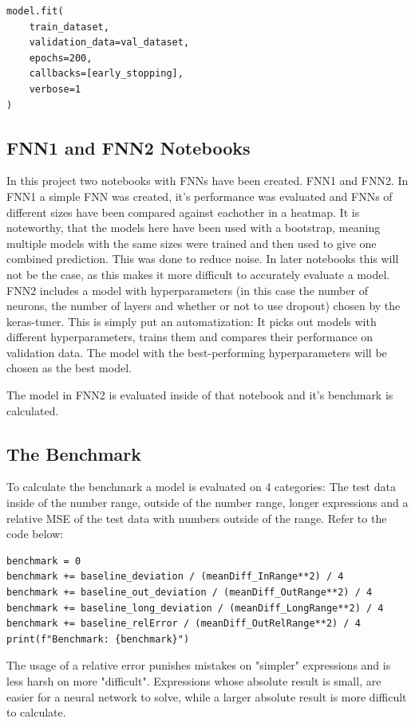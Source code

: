 \documentclass{article}
\begin{document}
\begin{Verbatim}
model.fit(
    train_dataset,
    validation_data=val_dataset,
    epochs=200,
    callbacks=[early_stopping],
    verbose=1
)
\end{Verbatim}

\subsection{FNN1 and FNN2 Notebooks}
In this project two notebooks with FNNs have been created. FNN1 and FNN2. 
In FNN1 a simple FNN was created, it's performance was evaluated and FNNs 
of different sizes have been compared against eachother in a heatmap. It is 
noteworthy, that the models here have been used with a bootstrap, meaning 
multiple models with the same sizes were trained and then used to give one 
combined prediction. This was done to reduce noise. In later notebooks this 
will not be the case, as this makes it more difficult to accurately evaluate 
a model.
\\[2em]
FNN2 includes a model with hyperparameters (in this case the number of 
neurons, the number of layers and whether or not to use dropout) chosen by 
the keras-tuner. This is simply put an automatization: It picks out models 
with different hyperparameters, trains them and compares their performance 
on validation data. The model with the best-performing hyperparameters will 
be chosen as the best model.

The model in FNN2 is evaluated inside of that notebook and it's benchmark 
is calculated.

\subsection{The Benchmark}
To calculate the benchmark a model is evaluated on 4 categories: The test 
data inside of the number range, outside of the number range, longer 
expressions and a relative MSE of the test data with numbers outside of the 
range.
Refer to the code below:
\begin{Verbatim}
benchmark = 0
benchmark += baseline_deviation / (meanDiff_InRange**2) / 4
benchmark += baseline_out_deviation / (meanDiff_OutRange**2) / 4
benchmark += baseline_long_deviation / (meanDiff_LongRange**2) / 4
benchmark += baseline_relError / (meanDiff_OutRelRange**2) / 4
print(f"Benchmark: {benchmark}")
\end{Verbatim}

The usage of a relative error punishes mistakes on "simpler" expressions and 
is less harsh on more "difficult". Expressions whose absolute result is 
small, are easier for a neural network to solve, while a larger absolute 
result is more difficult to calculate.
\end{document}
